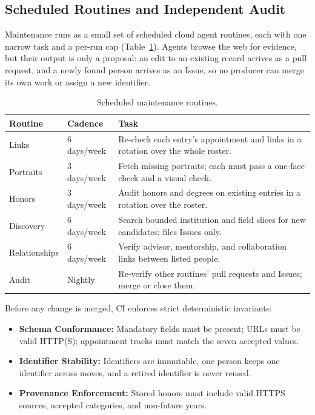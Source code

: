 \documentclass[11pt]{article}
\begin{document}
\subsection{Scheduled Routines and Independent Audit}
Maintenance runs as a small set of scheduled cloud agent routines, each with one narrow task and a per-run cap (Table~\ref{tab:routines}). Agents browse the web for evidence, but their output is only a proposal: an edit to an existing record arrives as a pull request, and a newly found person arrives as an Issue, so no producer can merge its own work or assign a new identifier.

\begin{table}[t]
\centering
\caption{Scheduled maintenance routines.}
\label{tab:routines}
\small
\begin{tabularx}{\linewidth}{@{}llX@{}}
\toprule
Routine & Cadence & Task \\
\midrule
Links & 6 days/week & Re-check each entry's appointment and links in a rotation over the whole roster. \\
Portraits & 3 days/week & Fetch missing portraits; each must pass a one-face check and a visual check. \\
Honors & 3 days/week & Audit honors and degrees on existing entries in a rotation over the roster. \\
Discovery & 6 days/week & Search bounded institution and field slices for new candidates; files Issues only. \\
Relationships & 6 days/week & Verify advisor, mentorship, and collaboration links between listed people. \\
Audit & Nightly & Re-verify other routines' pull requests and Issues; merge or close them. \\
\bottomrule
\end{tabularx}
\end{table}

Before any change is merged, CI enforces strict deterministic invariants:
\begin{itemize}
\item \textbf{Schema Conformance:} Mandatory fields must be present; URLs must be valid HTTP(S); appointment tracks must match the seven accepted values.
\item \textbf{Identifier Stability:} Identifiers are immutable, one person keeps one identifier across moves, and a retired identifier is never reused.
\item \textbf{Provenance Enforcement:} Stored honors must include valid HTTPS sources, accepted categories, and non-future years.
\end{itemize}
\end{document}
